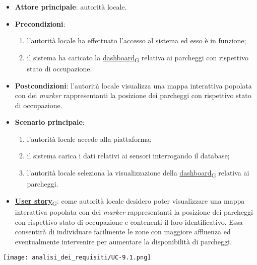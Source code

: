 \begin{itemize}
	\item \textbf{Attore principale}: autorità locale.
	\item \textbf{Precondizioni}:
	      \begin{enumerate}
		      \item l'autorità locale ha effettuato l'accesso al sistema ed esso è in funzione;
		      \item il sistema ha caricato la \href{https://7last.github.io/docs/pb/documentazione-interna/glossario\#dashboard}{dashboard\textsubscript{G}} relativa ai parcheggi con rispettivo stato di occupazione.
	      \end{enumerate}
	\item \textbf{Postcondizioni}: l'autorità locale visualizza una mappa interattiva popolata con dei \textit{marker} rappresentanti la posizione dei parcheggi con rispettivo stato di occupazione.
	\item \textbf{Scenario principale}:
	      \begin{enumerate}
		      \item l'autorità locale accede alla piattaforma;
		      \item il sistema carica i dati relativi ai sensori interrogando il database;
		      \item l'autorità locale seleziona la visualizzazione della \href{https://7last.github.io/docs/pb/documentazione-interna/glossario\#dashboard}{dashboard\textsubscript{G}} relativa ai parcheggi.
	      \end{enumerate}
	\item \href{https://7last.github.io/docs/pb/documentazione-interna/glossario\#user-story}{\textbf{User story}\textsubscript{G}}:
	      come autorità locale desidero poter visualizzare una mappa interattiva popolata con dei \textit{marker} rappresentanti la posizione dei parcheggi con rispettivo stato di occupazione
	      e contenenti il loro identificativo. Essa consentirà di individuare facilmente le zone con maggiore affluenza ed eventualmente intervenire per aumentare la disponibilità di parcheggi.
\end{itemize}
\begin{center}
	\texttt{[image: analisi\_dei\_requisiti/UC-9.1.png]}
\end{center}

